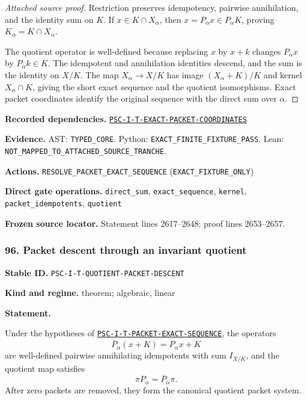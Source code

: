 \documentclass[a4paper,11pt]{article}
\newcommand{\field}[2]{\noindent\textbf{#1.} #2\par}
\begin{document}
\begin{proof}[Attached source proof]
Restriction preserves idempotency, pairwise annihilation, and the identity sum on $K$.  If $x\in K\cap X_\alpha$, then $x=P_\alpha x\in P_\alpha K$, proving $K_\alpha=K\cap X_\alpha$.

The quotient operator is well-defined because replacing $x$ by $x+k$ changes $P_\alpha x$ by $P_\alpha k\in K$.  The idempotent and annihilation identities descend, and the sum is the identity on $X/K$.  The map $X_\alpha\to X/K$ has image $(X_\alpha+K)/K$ and kernel $X_\alpha\cap K$, giving the short exact sequence and the quotient isomorphisms.  Exact packet coordinates identify the original sequence with the direct sum over $\alpha$.
\end{proof}
\field{Recorded dependencies}{\hyperref[rec:PSC-I-T-EXACT-PACKET-COORDINATES]{\nolinkurl{PSC-I-T-EXACT-PACKET-COORDINATES}}}
\field{Evidence}{AST: \nolinkurl{TYPED_CORE}. Python: \nolinkurl{EXACT_FINITE_FIXTURE_PASS}. Lean: \nolinkurl{NOT_MAPPED_TO_ATTACHED_SOURCE_TRANCHE}.}
\field{Actions}{\nolinkurl{RESOLVE_PACKET_EXACT_SEQUENCE} (\nolinkurl{EXACT_FIXTURE_ONLY})}
\field{Direct gate operations}{\nolinkurl{direct_sum}, \nolinkurl{exact_sequence}, \nolinkurl{kernel}, \nolinkurl{packet_idempotents}, \nolinkurl{quotient}}
\field{Frozen source locator}{Statement lines 2617--2648; proof lines 2653--2657.}
\subsubsection*{96. Packet descent through an invariant quotient}
\label{rec:PSC-I-T-QUOTIENT-PACKET-DESCENT}
\field{Stable ID}{\nolinkurl{PSC-I-T-QUOTIENT-PACKET-DESCENT}}
\field{Kind and regime}{theorem; algebraic, linear}
\textbf{Statement.}\par
Under the hypotheses of \hyperref[rec:PSC-I-T-PACKET-EXACT-SEQUENCE]{\nolinkurl{PSC-I-T-PACKET-EXACT-SEQUENCE}}, the operators
\[
\overline P_\alpha(x+K)=P_\alpha x+K
\]
are well-defined pairwise annihilating idempotents with sum $I_{X/K}$, and the quotient map satisfies
\[
\boxed{\pi P_\alpha=\overline P_\alpha\pi.}
\]
After zero packets are removed, they form the canonical quotient packet system.
\end{document}
